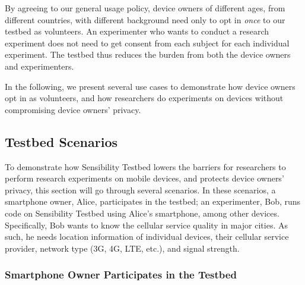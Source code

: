 By agreeing to our general usage policy, device 
owners of different ages, from different countries, with different
background need only to opt in \textit{once} to our testbed as 
volunteers. An experimenter who wants to conduct a research 
experiment 
does not need to get consent from each subject for each individual
experiment. The testbed thus reduces the burden from both the 
device owners and experimenters. 

In the following, we present several use cases to
demonstrate how device owners opt in as volunteers, and how
researchers do experiments on devices without compromising device
owners' privacy.

\subsection{Testbed Scenarios}\label{sec-scenario}

To demonstrate how Sensibility Testbed lowers the barriers for
researchers to perform research experiments on mobile devices,
and protects device owners' privacy, this section will go
through several scenarios. In these scenarios, a smartphone owner, Alice,
participates in the testbed; an experimenter, Bob, runs code on
Sensibility Testbed using Alice's smartphone, among other
devices. Specifically, Bob wants to know the cellular service
quality in major cities. As such, he needs location information
of individual devices, their cellular service provider, network
type (3G, 4G, LTE, etc.), and signal strength.

\subsubsection{Smartphone Owner Participates in the Testbed}
\label{sec-owner-participate}

